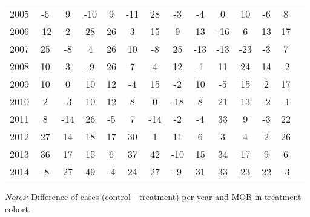 \begin{table}[H]
\begin{threeparttable}
{\begin{tabular}{l*{13}{c}}
2005        &          -6&           9&         -10&           9&         -11&          28&          -3&          -4&           0&          10&          -6&           8\\
2006        &         -12&           2&          28&          26&           3&          15&           9&          13&         -16&           6&          13&          17\\
2007        &          25&          -8&           4&          26&          10&          -8&          25&         -13&         -13&         -23&          -3&           7\\
2008        &          10&           3&          -9&          26&           7&           4&          12&          -1&          11&          24&          14&          -2\\
2009        &          10&           0&          10&          12&          -4&          15&          -2&          10&          -5&          15&           2&          17\\
2010        &           2&          -3&          10&          12&           8&           0&         -18&           8&          21&          13&          -2&          -1\\
2011        &           8&         -14&          26&          -5&           7&         -14&          -2&          -4&          33&           9&          -3&          22\\
2012        &          27&          14&          18&          17&          30&           1&          11&           6&           3&           4&           2&          26\\
2013        &          36&          17&          15&           6&          37&          42&         -10&          15&          34&          17&           9&           6\\
2014        &          -8&          27&          49&          -4&          24&          27&          -9&          31&          33&          23&          22&          -3\\
 \bottomrule \end{tabular} } \begin{tablenotes} \item \scriptsize \emph{Notes:} Difference of cases (control - treatment) per year and MOB in treatment cohort. \end{tablenotes} \end{threeparttable} \end{table} 
